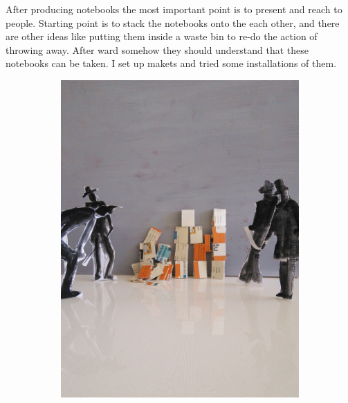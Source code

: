 




After producing notebooks the most important point is to present and reach to people. Starting point is to stack the notebooks onto the each other, and there are other ideas like putting them inside a waste bin to re-do the action of throwing away. After ward somehow they should understand that these notebooks can be taken. I set up makets and tried some installations of them.

\begin{figure}
    \centering
    \begin{subfigure}[b]{0.3\textwidth}
        \includegraphics[width=\textwidth]{project_graphics/exhibition1.jpg}
        \label{fig:exhibition1}
    \end{subfigure}
    \begin{subfigure}[b]{0.3\textwidth}

\end{subfigure}
\end{figure}
